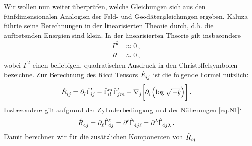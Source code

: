 Wir wollen nun weiter überprüfen, welche Gleichungen sich aus den
fünfdimensionalen Analogien der Feld- und Geodätengleichungen ergeben.
Kaluza führte seine Berechnungen in der linearisierten Theorie durch, d.h. 
die auftretenden Energien sind klein.
In der linearisierten Theorie gilt insbesondere
\begin{align}
\Gamma^2&\approx 0\tag{N1}\label{eq:N1}\,,\\
R&\approx 0\tag{N2}\label{eq:N2}\,,
\end{align}
wobei $\Gamma^2$ einen beliebigen, quadratischen Ausdruck in den
Christoffelsymbolen bezeichne.
Zur Berechnung des Ricci Tensors
$\tensor{\hat{R}}{_i_j}$ ist die folgende Formel nützlich:
\begin{equation}
\tensor{\hat{R}}{_i_j}=\tensor{\partial}{_l}\tensor*{\hat{\Gamma}}{^l_i_j}
-\tensor*{\hat{\Gamma}}{^m_i_l}\tensor*{\hat{\Gamma}}{^l_j_m}
-\tensor{\nabla}{_j}\left[\tensor{\partial}{_i}\left(\log\sqrt{-\hat{g}}\right)\right]\,
.\end{equation}
Insbesondere gilt aufgrund der Zylinderbedingung und der Näherungen
\eqref{eq:N1}`
\begin{equation}
\tensor{\hat{R}}{_4_j}=\tensor{\partial}{_\ell}\tensor*{\hat{\Gamma}}{^\ell_4_j}
=\tensor{\partial}{^\ell}\tensor*{\hat{\Gamma}}{_4_j_\ell}
=\tensor{\partial}{^\lambda}\tensor*{\hat{\Gamma}}{_4_j_\lambda}\,.
\end{equation}
Damit berechnen wir für die zusätzlichen Komponenten von $\tensor{\hat{R}}{_i_j}$ 

